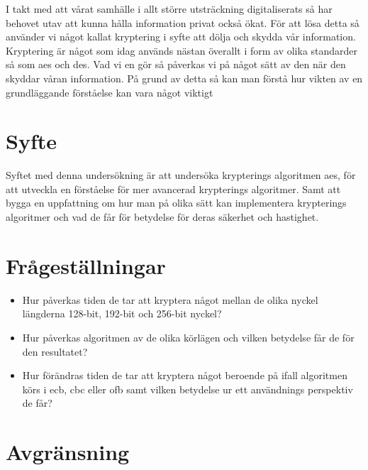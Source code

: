 
I takt med att vårat samhälle i allt större utsträckning digitaliserats så har behovet utav att kunna
hålla information privat också ökat. För att lösa detta så använder vi något kallat kryptering i syfte
att dölja och skydda vår information. Kryptering är något som idag används nästan överallt i form av olika
standarder så som \acrshort{aes} och \acrshort{des}. Vad vi en gör så påverkas vi på något sätt av den när
den skyddar våran information. På grund av detta så kan man förstå hur vikten av en grundläggande
förståelse kan vara något viktigt

\section{Syfte} %
Syftet med denna undersökning är att undersöka krypterings algoritmen \acrshort{aes},
för att utveckla en förståelse för mer avancerad krypterings algoritmer.
Samt att bygga en uppfattning om hur man på olika sätt kan implementera
krypterings algoritmer och vad de får för betydelse för deras säkerhet och
hastighet.

\section{Frågeställningar} %
\begin{itemize}
    \setlength{\itemindent}{-1em}
    \item Hur påverkas tiden de tar att kryptera något mellan de olika nyckel längderna 128-bit,
          192-bit och 256-bit nyckel?

    \item Hur påverkas algoritmen av de olika körlägen och vilken betydelse får de för den resultatet?

    \item Hur förändras tiden de tar att kryptera något beroende på ifall algoritmen körs i
          \acrshort{ecb}, \acrshort{cbc} eller \acrshort{ofb} samt vilken betydelse ur ett
          användnings perspektiv de får?
\end{itemize}

\section{Avgränsning} %

